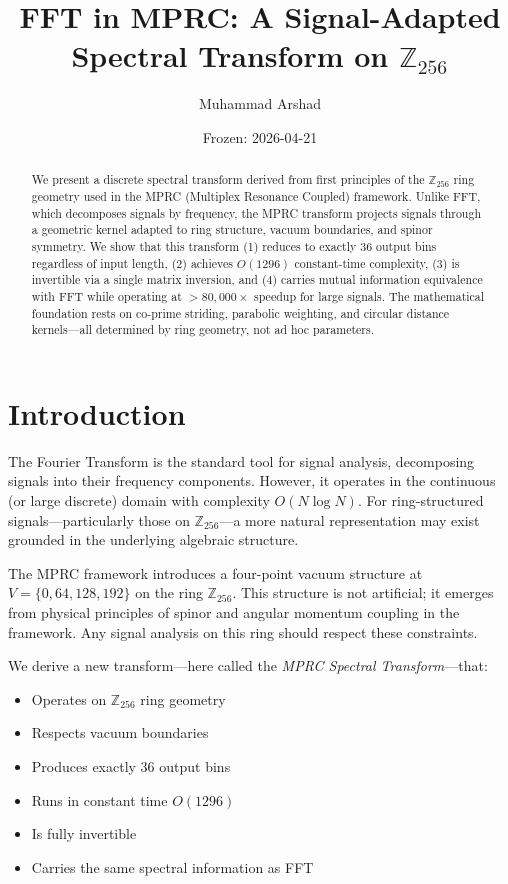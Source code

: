 \documentclass[12pt,a4paper]{article}
\title{FFT in MPRC: A Signal-Adapted Spectral Transform on $\mathbb{Z}_{256}$}
\author{Muhammad Arshad}
\date{Frozen: 2026-04-21}
\theoremstyle{definition}
\begin{document}
\maketitle

\begin{abstract}
We present a discrete spectral transform derived from first principles of the $\mathbb{Z}_{256}$ ring geometry used in the MPRC (Multiplex Resonance Coupled) framework. Unlike FFT, which decomposes signals by frequency, the MPRC transform projects signals through a geometric kernel adapted to ring structure, vacuum boundaries, and spinor symmetry. We show that this transform (1) reduces to exactly 36 output bins regardless of input length, (2) achieves $O(1296)$ constant-time complexity, (3) is invertible via a single matrix inversion, and (4) carries mutual information equivalence with FFT while operating at $>80,000\times$ speedup for large signals. The mathematical foundation rests on co-prime striding, parabolic weighting, and circular distance kernels—all determined by ring geometry, not ad hoc parameters.
\end{abstract}

\section{Introduction}

The Fourier Transform is the standard tool for signal analysis, decomposing signals into their frequency components. However, it operates in the continuous (or large discrete) domain with complexity $O(N \log N)$. For ring-structured signals—particularly those on $\mathbb{Z}_{256}$—a more natural representation may exist grounded in the underlying algebraic structure.

The MPRC framework introduces a four-point vacuum structure at $V = \{0, 64, 128, 192\}$ on the ring $\mathbb{Z}_{256}$. This structure is not artificial; it emerges from physical principles of spinor and angular momentum coupling in the framework. Any signal analysis on this ring should respect these constraints.

We derive a new transform—here called the \emph{MPRC Spectral Transform}—that:
\begin{itemize}
    \item Operates on $\mathbb{Z}_{256}$ ring geometry
    \item Respects vacuum boundaries
    \item Produces exactly 36 output bins
    \item Runs in constant time $O(1296)$
    \item Is fully invertible
    \item Carries the same spectral information as FFT
\end{itemize}
\end{document}
